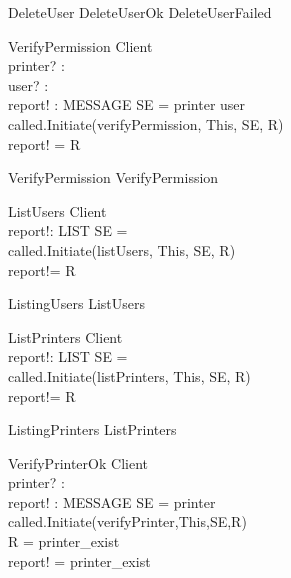 \begin{zed}
DeleteUser \sdef DeleteUserOk \lor DeleteUserFailed \end{zed}


\begin{schema}{VerifyPermission}
\Xi Client \\
printer? : \nat \\
user? : \nat \\
report! : MESSAGE
\where
SE = \lseq printer user \rseq \\
called.Initiate(verifyPermission, This, SE, R) \\
report! = R
\end{schema}

\begin{zed}
VerifyPermission \sdef VerifyPermission \end{zed}

\begin{schema}{ListUsers}
\Delta Client \\
report!: LIST
\where
SE = \lseq  \rseq \\
called.Initiate(listUsers, This, SE, R) \\
report!= R
\end{schema}

\begin{zed}
ListingUsers \sdef ListUsers \end{zed}

\begin{schema}{ListPrinters}
\Delta Client \\
report!: LIST
\where
SE = \lseq  \rseq \\
called.Initiate(listPrinters, This, SE, R) \\
report!= R
\end{schema}

\begin{zed}
ListingPrinters \sdef ListPrinters \end{zed}

\begin{schema}{VerifyPrinterOk}
\Xi Client \\
printer? : \nat \\
report! : MESSAGE
\where
SE = \lseq printer \rseq \\
called.Initiate(verifyPrinter,This,SE,R) \\
R = printer\_exist \\
report! = printer\_exist
\end{schema}


